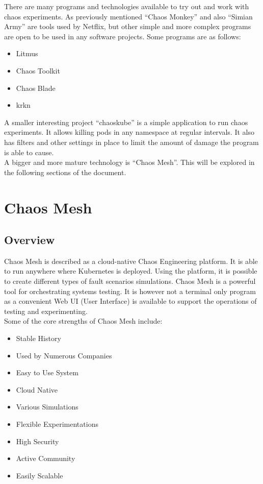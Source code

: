 \documentclass[conference]{IEEEtran}
\begin{document}
There are many programs and technologies available to try out and work with chaos experiments. As previously mentioned ``Chaos Monkey'' and also ``Simian Army'' are tools used by Netflix, but other simple and more complex programs are open to be used in any software projects. Some programs are as follows:
\begin{itemize}
	\item Litmus
	\item Chaos Toolkit
	\item Chaos Blade
	\item krkn \cite{b1}
\end{itemize}
A smaller interesting project ``chaoskube'' is a simple application to run chaos experiments. It allows killing pods in any namespace at regular intervals. It also has filters and other settings in place to limit the amount of damage the program is able to cause. \cite{b4} \\
A bigger and more mature technology is ``Chaos Mesh''. This will be explored in the following sections of the document.


\section{Chaos Mesh}
\subsection{Overview}

Chaos Mesh is described as a cloud-native Chaos Engineering platform. It is able to run anywhere where Kubernetes is deployed. Using the platform, it is possible to create different types of fault scenarios simulations. Chaos Mesh is a powerful tool for orchestrating systems testing. It is however not a terminal only program as a convenient Web UI (User Interface) is available to support the operations of testing and experimenting.\\
Some of the core strengths of Chaos Mesh include:
\begin{itemize}
	\item Stable History
	\item Used by Numerous Companies
	\item Easy to Use System
	\item Cloud Native
	\item Various Simulations
	\item Flexible Experimentations
	\item High Security
	\item Active Community
	\item Easily Scalable
\end{itemize}
\end{document}
